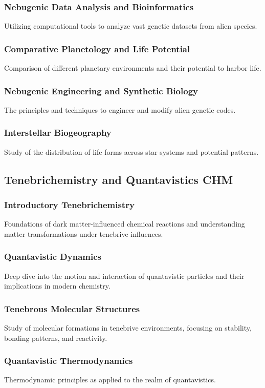 \subsubsection{Nebugenic Data Analysis and Bioinformatics}
Utilizing computational tools to analyze vast genetic datasets from alien species.
\subsubsection{Comparative Planetology and Life Potential}
Comparison of different planetary environments and their potential to harbor life.
\subsubsection{Nebugenic Engineering and Synthetic Biology}
The principles and techniques to engineer and modify alien genetic codes.
\subsubsection{Interstellar Biogeography}
Study of the distribution of life forms across star systems and potential patterns.


\subsection{Tenebrichemistry and Quantavistics \hfill CHM}
\subsubsection{Introductory Tenebrichemistry}
Foundations of dark matter-influenced chemical reactions and understanding matter transformations under tenebrive influences.
\subsubsection{Quantavistic Dynamics}
Deep dive into the motion and interaction of quantavistic particles and their implications in modern chemistry.
\subsubsection{Tenebrous Molecular Structures}
Study of molecular formations in tenebrive environments, focusing on stability, bonding patterns, and reactivity.
\subsubsection{Quantavistic Thermodynamics}
Thermodynamic principles as applied to the realm of quantavistics.
